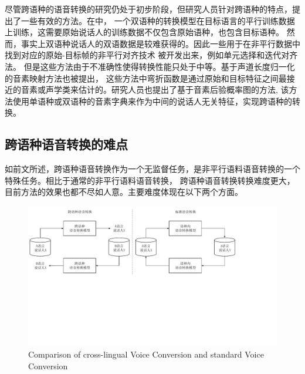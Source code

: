 尽管跨语种的语音转换的研究仍处于初步阶段，但研究人员针对跨语种的特点，提出了一些有效的方法。在\cite{AbeStatistical}中，
一个双语种的转换模型在目标语言的平行训练数据上训练，这需要原始说话人的训练数据不仅包含原始语种，也包含目标语种。
然而，事实上双语种说话人的双语数据是较难获得的。因此一些用于在非平行数据中找到对应的原始-目标帧的非平行对齐技术
被开发出来，例如单元选择\cite{sundermann2006text,Hao2015AA}和迭代对齐法\cite{erro2007frame,erro2009inca}。
但是这些方法由于不准确性使得转换性能只处于中等。基于声道长度归一化的音素映射方法也被提出\cite{sundermann2003vtln,qian2011frame}，
这些方法中弯折函数是通过原始和目标特征之间最接近的音素或声学类来估计的。研究人员也提出了基于音素后验概率图的方法\cite{sun2016personalized,zhou2019cross},
该方法使用单语种或双语种的音素字典来作为中间的说话人无关特征，实现跨语种的转换。

\subsection{跨语种语音转换的难点}
如前文所述，跨语种语音转换作为一个无监督任务，是非平行语料语音转换的一个特殊任务。相比于通常的非平行语料语音转换，
跨语种语音转换转换难度更大，目前方法的效果也都不尽如人意。主要难度体现在以下两个方面。

\begin{figure}[!htp]
    \centering
    \includegraphics[width=14cm,trim=0 200 80 10,clip]{figure/5_clvc.pdf}
    {Comparison of cross-lingual Voice Conversion and standard Voice Conversion}
    \label{fig:clvc}
\end{figure}

